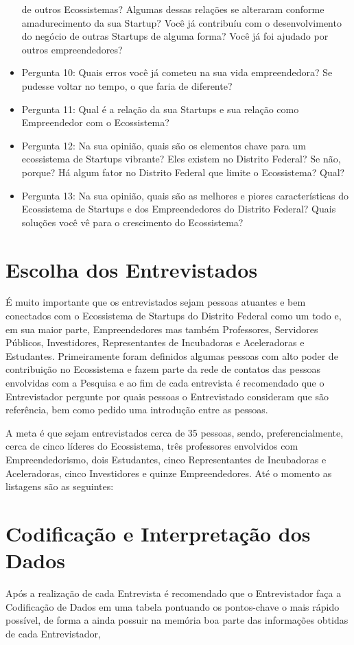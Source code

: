 \begin{itemize}
  de outros Ecossistemas? Algumas dessas relações se alteraram conforme amadurecimento da sua Startup? Você já contribuíu com o desenvolvimento do negócio de outras Startups de alguma forma? Você
  já foi ajudado por outros empreendedores?
  \item Pergunta 10: Quais erros você já cometeu na sua vida empreendedora? Se pudesse voltar no tempo, o que faria de diferente?
  \item Pergunta 11: Qual é a relação da sua Startups e sua relação como Empreendedor com o Ecossistema?
  \item Pergunta 12: Na sua opinião, quais são os elementos chave para um ecossistema de Startups vibrante? Eles existem no Distrito Federal? Se não, porque? Há algum fator no Distrito Federal que
  limite o Ecossistema? Qual?
  \item Pergunta 13: Na sua opinião, quais são as melhores e piores características do Ecossistema de Startups e dos Empreendedores do Distrito Federal? Quais soluções você vê para o crescimento do
  Ecossistema?
\end{itemize}

\section{Escolha dos Entrevistados}
\label{section:escolha_dos_entrevistados}

É muito importante que os entrevistados sejam pessoas atuantes e bem conectados com o Ecossistema de Startups do Distrito Federal como um todo e, em sua maior parte, Empreendedores mas também
Professores, Servidores Públicos, Investidores, Representantes de Incubadoras e Aceleradoras e Estudantes. Primeiramente foram definidos algumas pessoas com alto poder de contribuição no Ecossistema
e fazem parte da rede de contatos das pessoas envolvidas com a Pesquisa e ao fim de cada entrevista é recomendado que o Entrevistador pergunte por quais pessoas o Entrevistado consideram que são
referência, bem como pedido uma introdução entre as pessoas.

A meta é que sejam entrevistados cerca de 35 pessoas, sendo, preferencialmente, cerca de cinco líderes do Ecossistema, três professores envolvidos com Empreendedorismo,
dois Estudantes, cinco Representantes de Incubadoras e Aceleradoras, cinco Investidores e quinze Empreendedores. Até o momento as listagens são as seguintes:

\section{Codificação e Interpretação dos Dados}
\label{section:codificacao_e_interpretacao_dos_dados}


Após a realização de cada Entrevista é recomendado que o Entrevistador faça a Codificação de Dados em uma tabela pontuando os pontos-chave o mais rápido possível, de forma a ainda possuir na memória
boa parte das informações obtidas de cada Entrevistador,
